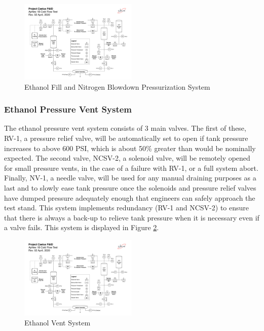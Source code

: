 \documentclass[9pt]{article} %
\numberwithin{equation}{section} %
\begin{document}
\begin{figure}[!htb] 
    \centering
    \includegraphics[scale=0.5, width=0.5\textwidth, trim={0cm 19cm 34.05cm 5cm}, clip]{Aphlex1B_04-02-2020_P&ID.pdf} %
    \caption{Ethanol Fill and Nitrogen Blowdown Pressurization System}
    \label{fig:ethanol_fill_and_pressurization_system}
\end{figure}

\subsubsection{Ethanol Pressure Vent System}
\hspace{\parindent} The ethanol pressure vent system consists of 3 main valves. The first of these, RV-1, a pressure relief valve, will be automatically set to open if tank pressure increases to above 600 PSI, which is about 50\% greater than would be nominally expected. The second valve, NCSV-2, a solenoid valve, will be remotely opened for small pressure vents, in the case of a failure with RV-1, or a full system abort. Finally, NV-1, a needle valve, will be used for any manual draining purposes as a last and to slowly ease tank pressure once the solenoids and pressure relief valves have dumped pressure adequately enough that engineers can safely approach the test stand. This system implements redundancy (RV-1 and NCSV-2) to ensure that there is always a back-up to relieve tank pressure when it is necessary even if a valve fails. This system is displayed in Figure \ref{fig:ethanol_vent_system}.

\begin{figure}[!htb] 
    \centering
    \includegraphics[scale=0.5, width=0.5\textwidth, trim={15cm 18cm 18.3cm 5cm}, clip]{Aphlex1B_04-02-2020_P&ID.pdf} %
    \caption{Ethanol Vent System}
    \label{fig:ethanol_vent_system}
\end{figure}
\end{document}
